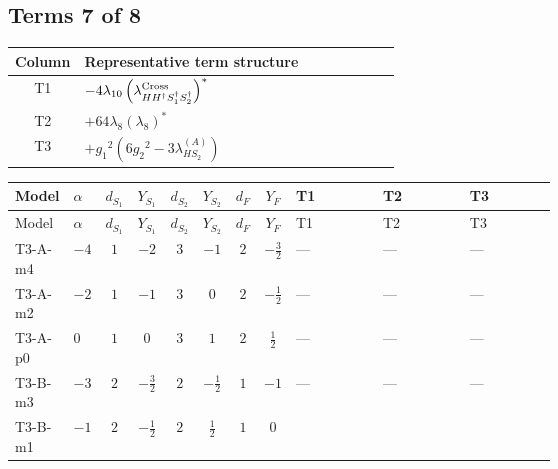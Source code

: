 \documentclass[8pt]{article}
\begin{document}
\begin{landscape}
\subsection*{Terms 7 of 8}
\begin{center}
\begin{tabular}{@{}c >{\raggedright\arraybackslash}p{0.82\linewidth}@{}}
\toprule
Column & Representative term structure \\
\midrule
T1 & \(\displaystyle -4 {\lambda_{10}} \left({\lambda_{H H^\dagger S_1^\dagger S_2^\dagger}^{\rm Cross}}\right)^{*}\) \\
\midrule
T2 & \(\displaystyle +64 {\lambda_{8}} \left({\lambda_{8}}\right)^{*}\) \\
\midrule
T3 & \(\displaystyle +{g_1}^2 \left(6 {g_2}^2-3 {\lambda_{HS_2}^{(A)}}\right)\) \\
\midrule
\bottomrule
\end{tabular}
\end{center}
\smallskip
\tiny
\begin{longtable}{@{}llcccccc >{\raggedright\arraybackslash}p{0.21\linewidth} >{\raggedright\arraybackslash}p{0.21\linewidth} >{\raggedright\arraybackslash}p{0.21\linewidth}@{}}
\toprule
Model & $\alpha$ & $d_{S_1}$ & $Y_{S_1}$ & $d_{S_2}$ & $Y_{S_2}$ & $d_F$ & $Y_F$ & T1 & T2 & T3 \\
\midrule
\endfirsthead
\toprule
Model & $\alpha$ & $d_{S_1}$ & $Y_{S_1}$ & $d_{S_2}$ & $Y_{S_2}$ & $d_F$ & $Y_F$ & T1 & T2 & T3 \\
\midrule
\endhead
T3-A-m4 & $-4$ & $1$ & $-2$ & $3$ & $-1$ & $2$ & $-\frac{3}{2}$ & --- & --- & --- \\
\midrule
T3-A-m2 & $-2$ & $1$ & $-1$ & $3$ & $0$ & $2$ & $-\frac{1}{2}$ & --- & --- & --- \\
\midrule
T3-A-p0 & $0$ & $1$ & $0$ & $3$ & $1$ & $2$ & $\frac{1}{2}$ & --- & --- & --- \\
\midrule
T3-B-m3 & $-3$ & $2$ & $-\frac{3}{2}$ & $2$ & $-\frac{1}{2}$ & $1$ & $-1$ & --- & --- & --- \\
\midrule
T3-B-m1 & $-1$ & $2$ & $-\frac{1}{2}$ & $2$ & $\frac{1}{2}$ & $1$ & $0$ & \scriptsize\adjustbox{max width=\linewidth}{$\begin{gathered} -4 {\lambda_{10}} \left({\lambda_{H H^\dagger S_1^\dagger S_2^\dagger}^{\rm Cross}}\right)^{*}\end{gathered}$} & \scriptsize\adjustbox{max width=\linewidth}{$\begin{gathered} +64 {\lambda_{8}} \left({\lambda_{8}}\right)^{*}\end{gathered}$} & \scriptsize\adjustbox{max width=\linewidth}{$\begin{gathered} +{g_1}^2 \left(6 {g_2}^2-3 {\lambda_{HS_2}^{(A)}}\right)\end{gathered}$} \\

\end{longtable}
\end{landscape}
\end{document}
